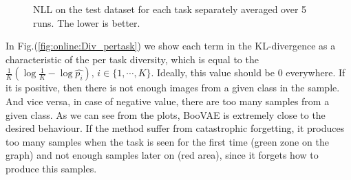 \begin{figure}[h]
	\centering
		 \hfill
		\hfill
		\caption{NLL on the test dataset for each task separately averaged over 5 runs. The lower is better.}\label{fig:online:NLL_pertask}
	\vspace*{\baselineskip}
\end{figure}
In Fig.(\ref{fig:online:Div_pertask}) we show each term in the KL-divergence as a characteristic of the per task diversity, which is equal to the $\tfrac1K \left(\log\tfrac1K - \log\hat{p_i}\right), \, i \in \{1, \cdots, K\}$. Ideally, this value should be 0 everywhere. If it is positive, then there is not enough images from a given class in the sample. And vice versa, in case of negative value, there are too many samples from a given class. As we can see from the plots, BooVAE is extremely close to the desired behaviour. If the method suffer from catastrophic forgetting, it produces too many samples when the task is seen for the first time (green zone on the graph) and not enough samples later on (red area), since it forgets how to produce this samples.
